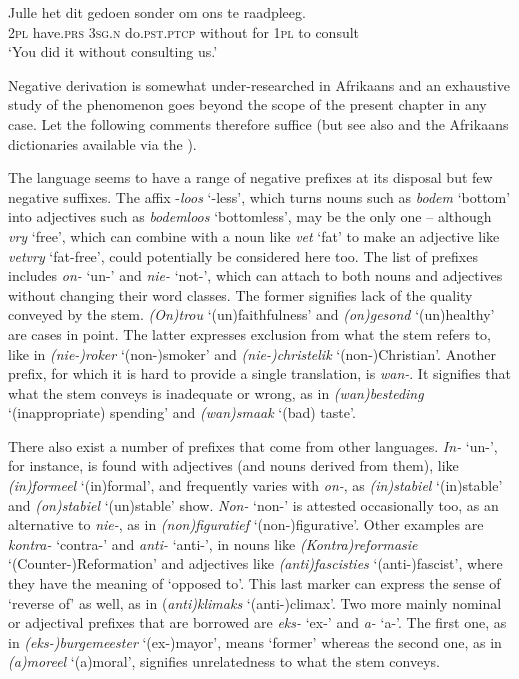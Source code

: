 \documentclass[output=paper,colorlinks,citecolor=brown]{langscibook}
\begin{document}
    \ex\label{ex:afr:33c}
        \gll Julle  het      dit     gedoen  sonder  om   ons   te  raadpleeg. \\
             2\textsc{pl} have.\textsc{prs} \textsc{3sg.n} do.\textsc{pst.ptcp} without for \textsc{1pl} to consult\\
        \glt ‘You did it without consulting us.’   
    \z
\z 

Negative derivation is somewhat under-researched in Afrikaans and an exhaustive study of the phenomenon goes beyond the scope of the present chapter in any case. Let the following comments therefore suffice (but see also \citealt{Huyssteen2019} and the Afrikaans dictionaries available via the  \citealt{VirtueleInstituutvirAfrikaans2019}).

The language seems to have a range of negative prefixes at its disposal but few negative suffixes. The affix -\textit{loos} ‘-less’, which turns nouns such as \textit{bodem} ‘bottom’ into adjectives such as \textit{bodemloos} ‘bottomless’, may be the only one – although \textit{vry} ‘free’, which can combine with a noun like \textit{vet} ‘fat’ to make an adjective like \textit{vetvry} ‘fat-free’, could potentially be considered here too. The list of prefixes includes \textit{on-} ‘un-’ and \textit{nie-} ‘not-’, which can attach to both nouns and adjectives without changing their word classes. The former signifies lack of the quality conveyed by the stem. \textit{(On)trou} ‘(un)faithfulness’ and \textit{(on)gesond} ‘(un)healthy’ are cases in point. The latter expresses exclusion from what the stem refers to, like in \textit{(nie-)roker} ‘(non-)smoker’ and \textit{(nie-)christelik} ‘(non-)Christian’. Another prefix, for which it is hard to provide a single translation, is \textit{wan-}. It signifies that what the stem conveys is inadequate or wrong, as in \textit{(wan)besteding} ‘(inappropriate) spending’ and \textit{(wan)smaak} ‘(bad) taste’. 

There also exist a number of prefixes that come from other languages. \textit{In-} ‘un-’, for instance, is found with adjectives (and nouns derived from them), like \textit{(in)formeel} ‘(in)formal’, and frequently varies with \textit{on-}, as \textit{(in)stabiel} ‘(in)stable’ and \textit{(on)stabiel} ‘(un)stable’ show. \textit{Non-} ‘non-’ is attested occasionally too, as an alternative to \textit{nie-}, as in \textit{(non)figuratief} ‘(non-)figurative’. Other examples are \textit{kontra-} ‘contra-’ and \textit{anti-} ‘anti-’, in nouns like \textit{(Kontra)reformasie} ‘(Counter\nobreakdash-)\-Reformation’ and adjectives like \textit{(anti)fascisties} ‘(anti-)fascist’, where they have the meaning of ‘opposed to’. This last marker can express the sense of ‘reverse of’ as well, as in (\textit{anti)klimaks} ‘(anti-)climax’. Two more mainly nominal or adjectival prefixes that are borrowed are \textit{eks-} ‘ex-’ and \textit{a-} ‘a-’. The first one, as in \textit{(eks-)burgemeester} ‘(ex-)mayor’, means ‘former’ whereas the second one, as in \textit{(a)moreel} ‘(a)moral’, signifies unrelatedness to what the stem conveys. 
\end{document}
